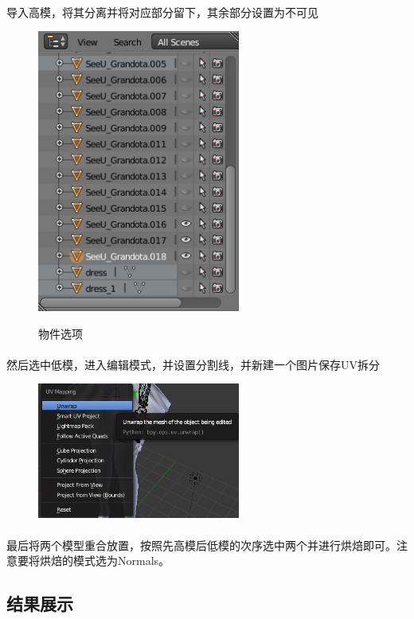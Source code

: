 \documentclass{article}
\begin{document}
\paragraph{}
导入高模，将其分离并将对应部分留下，其余部分设置为不可见
\begin{figure}[H]
  \centering
  \includegraphics[width=18em]{setting.png}\\
  \caption{物件选项}\label{1-3}
\end{figure}
\paragraph{}
然后选中低模，进入编辑模式，并设置分割线，并新建一个图片保存UV拆分
\begin{figure}
  \centering
  \includegraphics[width=18em]{unwrap.png}\\
  \caption{}\label{1-4}
\end{figure}
\paragraph{}
最后将两个模型重合放置，按照先高模后低模的次序选中两个并进行烘焙即可。注意要将烘焙的模式选为Normals。
\subsection{结果展示}
\end{document}
